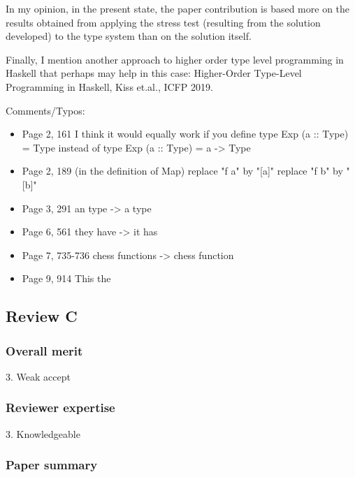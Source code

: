 In my opinion, in the present state, the paper contribution is based more on the results obtained from applying the stress test (resulting from the solution developed) to the type system than on the solution itself.

Finally, I mention another approach to higher order type level programming in Haskell that perhaps may help in this case: Higher-Order Type-Level Programming in Haskell, Kiss et.al., ICFP 2019.

Comments/Typos:

\begin{itemize}
      \item Page 2, 161
            I think it would equally work if you define
            type Exp (a :: Type) = Type
            instead of
            type Exp (a :: Type) = a -> Type

      \item Page 2, 189 (in the definition of Map)
            replace "f a" by "[a]"
            replace "f b" by "[b]"

      \item Page 3, 291
            an type -> a type

      \item Page 6, 561
            they have -> it has

      \item Page 7, 735-736
            chess functions -> chess function

      \item Page 9, 914
            This the
\end{itemize}

\subsection{Review C}

\subsubsection{Overall merit}

3. Weak accept

\subsubsection{Reviewer expertise}

3. Knowledgeable

\subsubsection{Paper summary}

